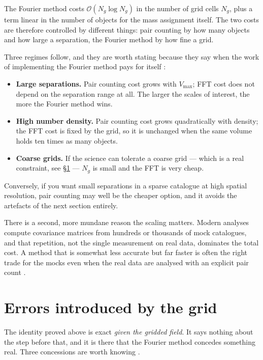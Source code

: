 \documentclass[12pt]{article}
\begin{document}
The Fourier method costs $\mathcal{O}(N_g \log N_g)$ in the number of grid
cells $N_g$, plus a term linear in the number of objects for the mass
assignment itself.  The two costs are therefore controlled by different
things: pair counting by how many objects and how large a separation, the
Fourier method by how fine a grid.

Three regimes follow, and they are worth stating because they say when the
work of implementing the Fourier method pays for itself
\citep{Slepian2016}:
\begin{itemize}
  \item \textbf{Large separations.} Pair counting cost grows with
        $V_{\max}$; FFT cost does not depend on the separation range at all.
        The larger the scales of interest, the more the Fourier method wins.
  \item \textbf{High number density.} Pair counting cost grows quadratically
        with density; the FFT cost is fixed by the grid, so it is unchanged
        when the same volume holds ten times as many objects.
  \item \textbf{Coarse grids.} If the science can tolerate a coarse grid ---
        which is a real constraint, see \S\ref{sec:gives-up} --- $N_g$ is
        small and the FFT is very cheap.
\end{itemize}
Conversely, if you want small separations in a sparse catalogue at high
spatial resolution, pair counting may well be the cheaper option, and it
avoids the artefacts of the next section entirely.

There is a second, more mundane reason the scaling matters.  Modern analyses
compute covariance matrices from hundreds or thousands of mock catalogues,
and that repetition, not the single measurement on real data, dominates the
total cost.  A method that is somewhat less accurate but far faster is often
the right trade for the mocks even when the real data are analysed with an
explicit pair count \citep{Slepian2016}.

\section{Errors introduced by the grid}\label{sec:gives-up}

The identity proved above is exact \emph{given the gridded field}.  It says
nothing about the step before that, and it is there that the Fourier method
concedes something real.  Three concessions are worth knowing
\citep{Slepian2016}.
\end{document}
